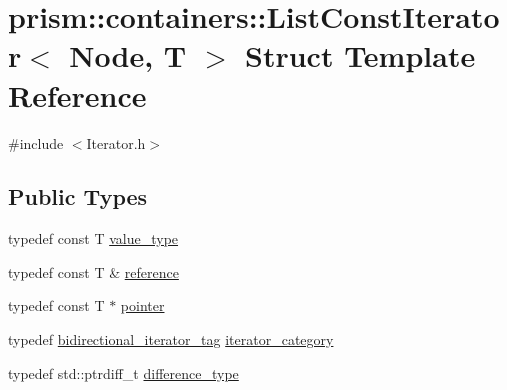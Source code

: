 \hypertarget{structprism_1_1containers_1_1_list_const_iterator}{}\section{prism\+:\+:containers\+:\+:List\+Const\+Iterator$<$ Node, T $>$ Struct Template Reference}
\label{structprism_1_1containers_1_1_list_const_iterator}


{\ttfamily \#include $<$Iterator.\+h$>$}

\subsection*{Public Types}
\begin{DoxyCompactItemize}
\item 
typedef const T \hyperlink{structprism_1_1containers_1_1_list_const_iterator_ac5195b8e18a3e7b6175610c8a578457f}{value\+\_\+type}
\item 
typedef const T \& \hyperlink{structprism_1_1containers_1_1_list_const_iterator_a75f67a8dc204310a4ec2ad3104b85c3c}{reference}
\item 
typedef const T $\ast$ \hyperlink{structprism_1_1containers_1_1_list_const_iterator_a14b03b825ec014eaf85130739c0fa35d}{pointer}
\item 
typedef \hyperlink{structprism_1_1containers_1_1bidirectional__iterator__tag}{bidirectional\+\_\+iterator\+\_\+tag} \hyperlink{structprism_1_1containers_1_1_list_const_iterator_ada7ce709fc59b146b1568a18a4a100c5}{iterator\+\_\+category}
\item 
typedef std\+::ptrdiff\+\_\+t \hyperlink{structprism_1_1containers_1_1_list_const_iterator_a64a29291c0139f4087a7c79690ed1e9e}{difference\+\_\+type}
\end{DoxyCompactItemize}
